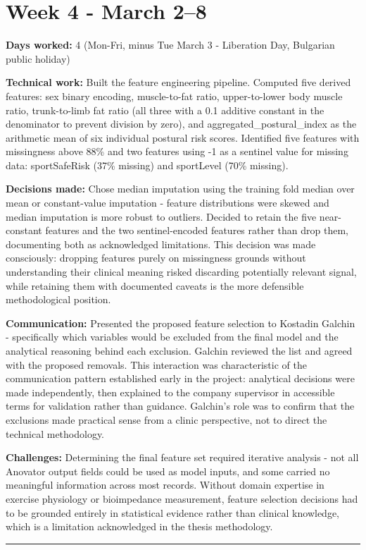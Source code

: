 \documentclass[11pt,a4paper]{article}
\begin{document}
\section{Week 4  -  March 2–8}

\textbf{Days worked:} 4 (Mon-Fri, minus Tue March 3 - Liberation Day, Bulgarian public holiday)

\textbf{Technical work:} Built the feature engineering pipeline. Computed five derived features: sex binary encoding, muscle-to-fat ratio, upper-to-lower body muscle ratio, trunk-to-limb fat ratio (all three with a 0.1 additive constant in the denominator to prevent division by zero), and aggregated\_postural\_index as the arithmetic mean of six individual postural risk scores. Identified five features with missingness above 88\% and two features using -1 as a sentinel value for missing data: sportSafeRisk (37\% missing) and sportLevel (70\% missing).

\textbf{Decisions made:} Chose median imputation using the training fold median over mean or constant-value imputation  -  feature distributions were skewed and median imputation is more robust to outliers. Decided to retain the five near-constant features and the two sentinel-encoded features rather than drop them, documenting both as acknowledged limitations. This decision was made consciously: dropping features purely on missingness grounds without understanding their clinical meaning risked discarding potentially relevant signal, while retaining them with documented caveats is the more defensible methodological position.

\textbf{Communication:} Presented the proposed feature selection to Kostadin Galchin  -  specifically which variables would be excluded from the final model and the analytical reasoning behind each exclusion. Galchin reviewed the list and agreed with the proposed removals. This interaction was characteristic of the communication pattern established early in the project: analytical decisions were made independently, then explained to the company supervisor in accessible terms for validation rather than guidance. Galchin's role was to confirm that the exclusions made practical sense from a clinic perspective, not to direct the technical methodology.

\textbf{Challenges:} Determining the final feature set required iterative analysis  -  not all Anovator output fields could be used as model inputs, and some carried no meaningful information across most records. Without domain expertise in exercise physiology or bioimpedance measurement, feature selection decisions had to be grounded entirely in statistical evidence rather than clinical knowledge, which is a limitation acknowledged in the thesis methodology.
\noindent\rule{\textwidth}{0.4pt}
\end{document}
